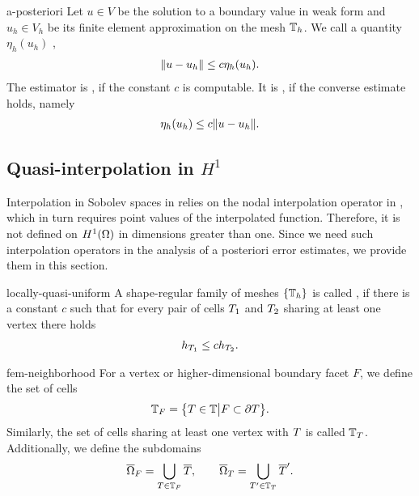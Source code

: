 \begin{Definition}{a-posteriori}
  Let $u\in V$ be the solution to a boundary value in weak form and
  $u_h\in V_h$ be its finite element approximation on the mesh
  $\mathbb T_h$. We call a quantity $\eta_h(u_h)$ ,
  \begin{gather}
    \lVert u-u_h\rVert \le c \eta_h(u_h).
  \end{gather}
  The estimator is , if the constant $c$ is
  computable. It is , if the converse estimate holds,
  namely
  \begin{gather}
    \eta_h(u_h) \le c \lVert u-u_h\rVert.
  \end{gather}
\end{Definition}

\subsection{Quasi-interpolation in $H^1$}

\begin{intro}
  Interpolation in Sobolev spaces in
   relies on the nodal
  interpolation operator in
  , which in turn requires
  point values of the interpolated function. Therefore, it is not
  defined on $H^1(\Omega)$ in dimensions greater than one. Since we
  need such interpolation operators in the analysis of a posteriori
  error estimates, we provide them in this section.
\end{intro}

\begin{Definition}{locally-quasi-uniform}
  A shape-regular family of meshes $\{\mathbb T_h\}$ is called
  , if there is a constant $c$ such that
  for every pair of cells $T_1$ and $T_2$ sharing at least one
  vertex there holds
  \begin{gather}
    h_{T_1} \le c h_{T_2}.
  \end{gather}
\end{Definition}

\begin{Definition}{fem-neighborhood}
  For a vertex or higher-dimensional boundary facet $F$, we define the
  set of cells
  \begin{gather}
    \mathbb T_{F} = \bigl\{ T\in\mathbb T \big|F \subset\partial T \bigr\}.
  \end{gather}
  Similarly, the set of cells sharing at least one vertex with $T$
  is called $\mathbb T_{T}$. Additionally, we define the subdomains
  \begin{gather}
    \overline{\Omega}_{F} = \bigcup_{T\in \mathbb T_{F}}\overline{T},
    \qquad
    \overline{\Omega}_{T} = \bigcup_{T'\in \mathbb T_{T}}\overline{T}'.
  \end{gather}
\end{Definition}

